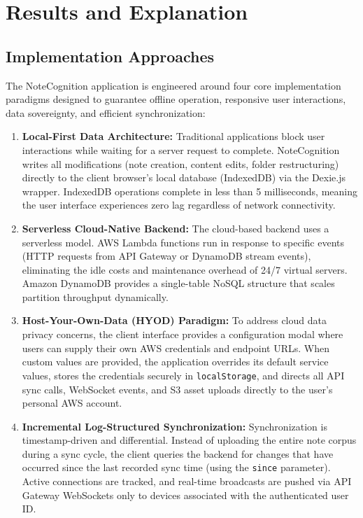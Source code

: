 \documentclass[12pt, a4paper, oneside]{report}
\begin{document}
\chapter{Results and Explanation}

\section{Implementation Approaches}
The NoteCognition application is engineered around four core implementation paradigms designed to guarantee offline operation, responsive user interactions, data sovereignty, and efficient synchronization:
\begin{enumerate}
    \item \textbf{Local-First Data Architecture:} Traditional applications block user interactions while waiting for a server request to complete. NoteCognition writes all modifications (note creation, content edits, folder restructuring) directly to the client browser's local database (IndexedDB) via the Dexie.js wrapper. IndexedDB operations complete in less than 5 milliseconds, meaning the user interface experiences zero lag regardless of network connectivity.
    \item \textbf{Serverless Cloud-Native Backend:} The cloud-based backend uses a serverless model. AWS Lambda functions run in response to specific events (HTTP requests from API Gateway or DynamoDB stream events), eliminating the idle costs and maintenance overhead of 24/7 virtual servers. Amazon DynamoDB provides a single-table NoSQL structure that scales partition throughput dynamically.
    \item \textbf{Host-Your-Own-Data (HYOD) Paradigm:} To address cloud data privacy concerns, the client interface provides a configuration modal where users can supply their own AWS credentials and endpoint URLs. When custom values are provided, the application overrides its default service values, stores the credentials securely in \texttt{localStorage}, and directs all API sync calls, WebSocket events, and S3 asset uploads directly to the user's personal AWS account.
    \item \textbf{Incremental Log-Structured Synchronization:} Synchronization is timestamp-driven and differential. Instead of uploading the entire note corpus during a sync cycle, the client queries the backend for changes that have occurred since the last recorded sync time (using the \texttt{since} parameter). Active connections are tracked, and real-time broadcasts are pushed via API Gateway WebSockets only to devices associated with the authenticated user ID.
\end{enumerate}
\end{document}
